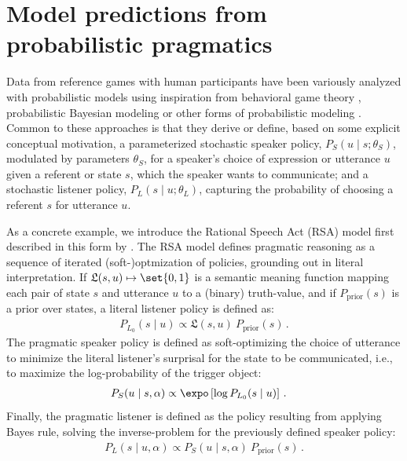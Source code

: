 \documentclass[fleqn]{article}
\begin{document}
\section{Model predictions from probabilistic pragmatics}
\label{sec:model-pred-from}

Data from reference games with human participants have been variously analyzed with probabilistic models using inspiration from behavioral game theory \citep[e.g.,][]{DegenFranke2013:Cost-Based-Prag}, probabilistic Bayesian modeling \citep[e.g.,][]{FrankGoodman2012:Predicting-Prag} or other forms of probabilistic modeling \citep[e.g.,][]{GattGompel2013:Are-we-Bayesian}.
Common to these approaches is that they derive or define, based on some explicit conceptual motivation, a parameterized stochastic speaker policy, $P_{S}(u \mid s; \theta_{S})$, modulated by parameters $\theta_{S}$, for a speaker's choice of expression or utterance $u$ given a referent or state $s$, which the speaker wants to communicate;
and a stochastic listener policy, $P_{L}(s \mid u; \theta_{L})$, capturing the probability of choosing a referent $s$ for utterance $u$.

As a concrete example, we introduce the Rational Speech Act (RSA) model first described in this form by \citet{FrankGoodman2012:Predicting-Prag} \citep[for overview see][]{FrankeJager2015:Probabilistic-p,GoodmanFrank2016:Pragmatic-Langu,StevensBenz2018:Game-Theoretic-,ScontrasTessler2021:A-practical-int,Degen2023:The-Rational-Sp}.
The RSA model defines pragmatic reasoning as a sequence of iterated (soft-)optmization of policies, grounding out in literal interpretation.
If $\mathfrak{L}(s,u) \mapsto \set{0,1}$ is a semantic meaning function mapping each pair of state $s$ and utterance $u$ to a (binary) truth-value, and if $P_{\text{prior}}(s)$ is a prior over states, a literal listener policy is defined as:
%
\begin{align*}
 P_{L_{0}}(s \mid u) \propto \mathfrak{L}(s,u)\  P_{\text{prior}}(s)\,.
\end{align*}
%
The pragmatic speaker policy is defined as soft-optimizing the choice of utterance to minimize the literal listener's surprisal for the state to be communicated, i.e., to maximize the log-probability of the trigger object:
%
\begin{align}
  \label{eq:RSA-speaker}
  P_{S}(u \mid s, \alpha) & \propto \expo \left [ \log P_{L_{0}}(s \mid u) \right ] \,.
\end{align}
%
Finally, the pragmatic listener is defined as the policy resulting from applying Bayes rule, solving the inverse-problem for the previously defined speaker policy:
%
\begin{align}
  \label{eq:RSA-interpreter}
  P_{L}(s \mid u, \alpha) \propto  P_{S}(u \mid s, \alpha) \  P_{\text{prior}}(s) \,.
\end{align}
\end{document}
